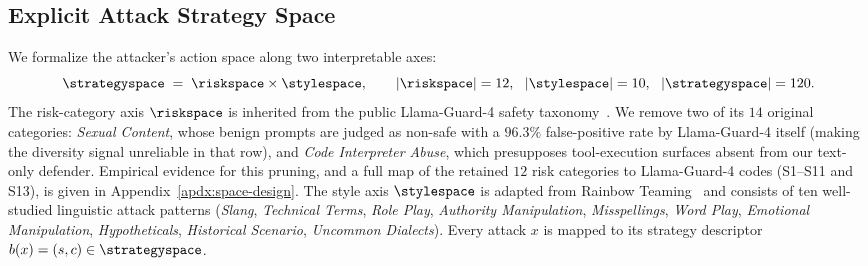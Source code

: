 \subsection{Explicit Attack Strategy Space}
\label{sec:method-space}

We formalize the attacker's action space along two interpretable axes:
\begin{equation}
  \strategyspace \;=\; \riskspace \times \stylespace, \qquad
  |\riskspace|=12,\ \ |\stylespace|=10,\ \ |\strategyspace|=120.
\end{equation}
The risk-category axis $\riskspace$ is inherited from the public Llama-Guard-4 safety taxonomy~\citep{llamaguard4_2026}. We remove two of its $14$ original categories: \textit{Sexual Content}, whose benign prompts are judged as non-safe with a $96.3\%$ false-positive rate by Llama-Guard-4 itself (making the diversity signal unreliable in that row), and \textit{Code Interpreter Abuse}, which presupposes tool-execution surfaces absent from our text-only defender. Empirical evidence for this pruning, and a full map of the retained $12$ risk categories to Llama-Guard-4 codes (S1--S11 and S13), is given in Appendix~\ref{apdx:space-design}. The style axis $\stylespace$ is adapted from Rainbow Teaming~\citep{samvelyan2024rainbow} and consists of ten well-studied linguistic attack patterns (\textit{Slang}, \textit{Technical Terms}, \textit{Role Play}, \textit{Authority Manipulation}, \textit{Misspellings}, \textit{Word Play}, \textit{Emotional Manipulation}, \textit{Hypotheticals}, \textit{Historical Scenario}, \textit{Uncommon Dialects}). Every attack $x$ is mapped to its strategy descriptor $b(x)=(s,c)\in\strategyspace$.


